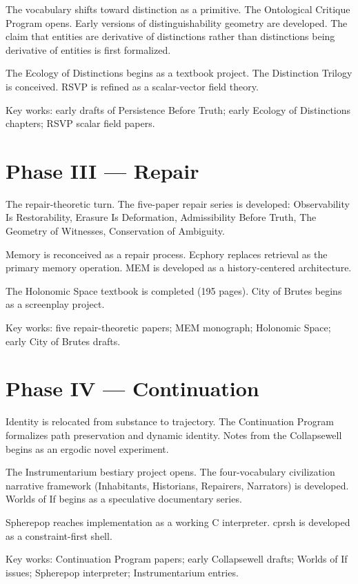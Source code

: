 \documentclass[12pt, openany]{book}
\begin{document}
The vocabulary shifts toward distinction as a primitive. The Ontological
Critique Program opens. Early versions of distinguishability geometry
are developed. The claim that entities are derivative of distinctions
rather than distinctions being derivative of entities is first formalized.

The Ecology of Distinctions begins as a textbook project. The Distinction
Trilogy is conceived. RSVP is refined as a scalar-vector field theory.

Key works: early drafts of Persistence Before Truth; early Ecology of
Distinctions chapters; RSVP scalar field papers.

\section{Phase III — Repair}

The repair-theoretic turn. The five-paper repair series is developed:
Observability Is Restorability, Erasure Is Deformation, Admissibility
Before Truth, The Geometry of Witnesses, Conservation of Ambiguity.

Memory is reconceived as a repair process. Ecphory replaces retrieval
as the primary memory operation. MEM is developed as a
history-centered architecture.

The Holonomic Space textbook is completed (195 pages). City of Brutes
begins as a screenplay project.

Key works: five repair-theoretic papers; MEM monograph; Holonomic
Space; early City of Brutes drafts.

\section{Phase IV — Continuation}

Identity is relocated from substance to trajectory. The Continuation
Program formalizes path preservation and dynamic identity. Notes from
the Collapsewell begins as an ergodic novel experiment.

The Instrumentarium bestiary project opens. The four-vocabulary
civilization narrative framework (Inhabitants, Historians, Repairers,
Narrators) is developed. Worlds of If begins as a speculative documentary
series.

Spherepop reaches implementation as a working C interpreter. cprsh is
developed as a constraint-first shell.

Key works: Continuation Program papers; early Collapsewell drafts; Worlds
of If issues; Spherepop interpreter; Instrumentarium entries.
\end{document}

